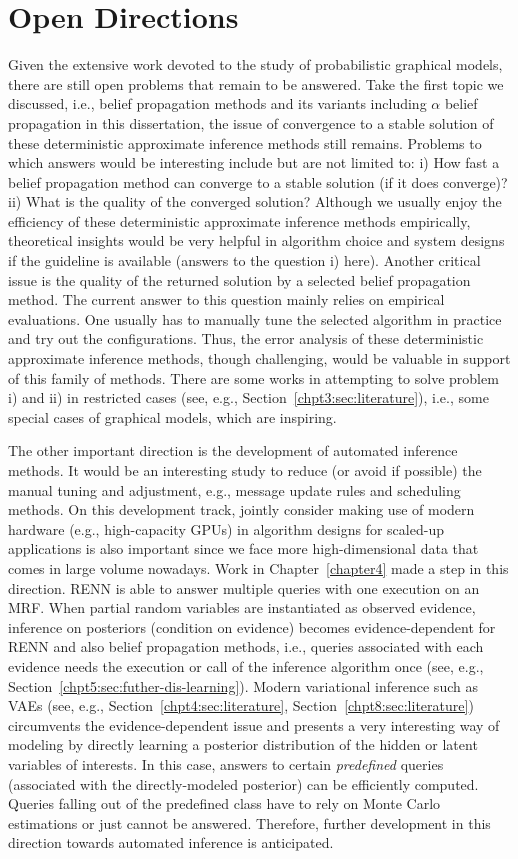 \section{Open Directions}
Given the extensive work devoted to the study of probabilistic graphical models, there are still open problems that remain to be answered. Take the first topic we discussed, i.e., belief propagation methods and its variants including $\alpha$ belief propagation in this dissertation, the issue of convergence to a stable solution of these deterministic approximate inference methods still remains. Problems to which answers would be interesting include but are not limited to: i) How fast a belief propagation method can converge to a stable solution (if it does converge)? ii) What is the quality of the converged solution? Although we usually enjoy the efficiency of these deterministic approximate inference methods empirically, theoretical insights would be very helpful in algorithm choice and system designs if the guideline is available (answers to the question i) here). Another critical issue is the quality of the returned solution by a selected belief propagation method. The current answer to this question mainly relies on empirical evaluations. One usually has to manually tune the selected algorithm in practice and try out the configurations. Thus, the error analysis of these deterministic approximate inference methods, though challenging, would be valuable in support of this family of methods. There are some works in attempting to solve problem i) and ii) in restricted cases (see, e.g., Section~\ref{chpt3:sec:literature}), i.e., some special cases of graphical models, which are inspiring. 

The other important direction is the development of automated inference methods. It would be an interesting study to reduce (or avoid if possible) the manual tuning and adjustment, e.g., message update rules and scheduling methods. On this development track, jointly consider making use of modern hardware (e.g., high-capacity GPUs) in algorithm designs for scaled-up applications is also important since we face more high-dimensional data that comes in large volume nowadays. Work in Chapter~\ref{chapter4} made a step in this direction. RENN is able to answer multiple queries with one execution on an MRF. When partial random variables are instantiated as observed evidence, inference on posteriors (condition on evidence) becomes evidence-dependent for RENN and also belief propagation methods, i.e., queries associated with each evidence needs the execution or call of the inference algorithm once (see, e.g., Section~\ref{chpt5:sec:futher-dis-learning}). Modern variational inference such as VAEs (see, e.g., Section~\ref{chpt4:sec:literature}, Section~\ref{chpt8:sec:literature}) circumvents the evidence-dependent issue and presents a very interesting way of modeling by directly learning a posterior distribution of the hidden or latent variables of interests. In this case, answers to certain \textit{predefined} queries (associated with the directly-modeled posterior) can be efficiently computed. Queries falling out of the predefined class have to rely on Monte Carlo estimations or just cannot be answered. Therefore, further development in this direction towards automated inference is anticipated.



